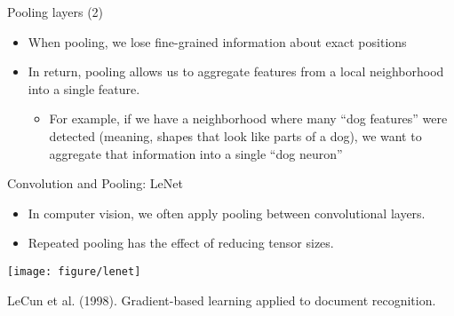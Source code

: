 
\begin{vbframe}{Pooling layers (2)}

\vfill

\begin{itemize}
\item When pooling, we lose fine-grained information about exact positions
\item In return, pooling allows us to aggregate features from a local neighborhood into a single feature.
\begin{itemize}
\item For example, if we have a neighborhood where many ``dog features'' were detected (meaning, shapes that look like parts of a dog), we want to aggregate that information into a single ``dog neuron''
\end{itemize}
\end{itemize}

\vfill

\end{vbframe}


\begin{vbframe}{Convolution and Pooling: LeNet}

\vfill

\begin{itemize}
	\item In computer vision, we often apply pooling between convolutional layers.
	\item Repeated pooling has the effect of reducing tensor sizes.
\end{itemize}
\begin{center}
\texttt{[image: figure/lenet]}
\end{center}
\footnotesize{LeCun et al. (1998). Gradient-based learning applied to document recognition.}

\vfill

\end{vbframe}


